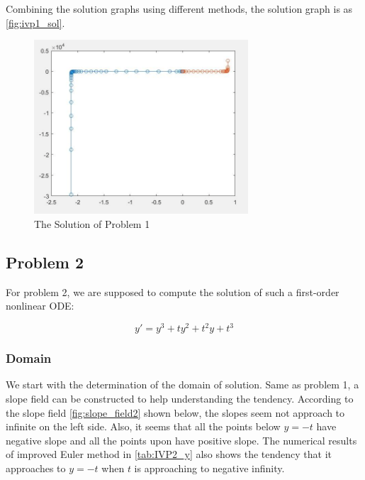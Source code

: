 \documentclass[a4paper]{article}
\begin{document}
	Combining the solution graphs using different methods, the solution graph is as \autoref{fig:ivp1_sol}.
	
	\begin{figure}[H]
		\centering
		\includegraphics[width=8cm]{img/ivp1_sol.png}
		\caption{\label{fig:ivp1_sol} The Solution of Problem 1}
	\end{figure}
	
	
	
	
	
	\subsection{Problem 2}
	
	For problem 2, we are supposed to compute the solution of such a first-order nonlinear ODE: 
	
	\begin{equation} \label{eq:ode2}
		y' = y^3 + ty^2 + t^2y + t^3 \tag{ODE2}
	\end{equation}
	
	
	\subsubsection{Domain}
	
	We start with the determination of the domain of solution. Same as problem 1, a slope field can be constructed to help understanding the tendency. According to the slope field \autoref{fig:slope_field2} shown below, the slopes seem not approach to infinite on the left side. Also, it seems that all the points below $y= -t$ have negative slope and all the points upon have positive slope. The numerical results of improved Euler method in \autoref{tab:IVP2_y} also shows the tendency that it approaches to $y = -t$ when $t$ is approaching to negative infinity. 
	
\end{document}
